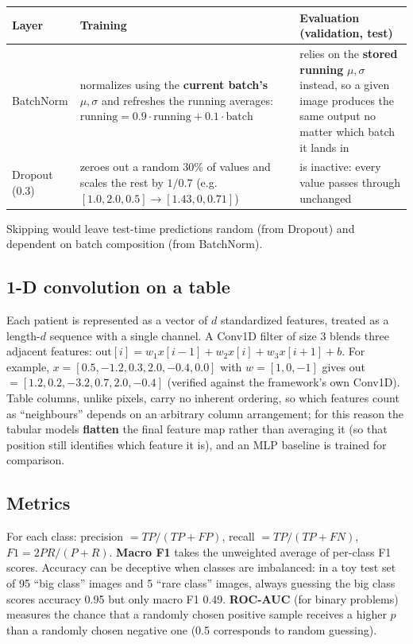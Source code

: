\documentclass[11pt, a4paper]{article}
\newcommand{\code}[1]{\texttt{\detokenize{#1}}}
\begin{document}
\begin{table}[H]
\centering
\small
\begin{tabular}{p{2.6cm}p{5.8cm}p{6.0cm}}
\toprule
Layer & Training & Evaluation (validation, test) \\
\midrule
BatchNorm & normalizes using the \textbf{current batch's} $\mu, \sigma$ and refreshes the running averages:
  $\text{running} = 0.9\cdot\text{running} + 0.1\cdot\text{batch}$
  & relies on the \textbf{stored running} $\mu, \sigma$ instead, so a given image produces the same output no matter
  which batch it lands in \\
Dropout (0.3) & zeroes out a random 30\% of values and scales the rest by $1/0.7$
  (e.g.\ $[1.0, 2.0, 0.5] \to [1.43, 0, 0.71]$) & is inactive: every value passes through unchanged \\
\bottomrule
\end{tabular}
\end{table}
Skipping \code{model.eval()} would leave test-time predictions random (from Dropout) and dependent on batch
composition (from BatchNorm).

\subsection{1-D convolution on a table}
Each patient is represented as a vector of $d$ standardized features, treated as a length-$d$ sequence with a single
channel. A Conv1D filter of size 3 blends three adjacent features: $\text{out}[i] = w_1x[i-1] + w_2x[i] + w_3x[i+1] + b$.
For example, $x = [0.5, -1.2, 0.3, 2.0, -0.4, 0.0]$ with $w = [1, 0, -1]$ gives
out $= [1.2, 0.2, -3.2, 0.7, 2.0, -0.4]$ (verified against the framework's own Conv1D). Table columns, unlike pixels,
carry no inherent ordering, so which features count as ``neighbours'' depends on an arbitrary column arrangement; for
this reason the tabular models \textbf{flatten} the final feature map rather than averaging it (so that position
still identifies which feature it is), and an MLP baseline is trained for comparison.

\subsection{Metrics}
For each class: precision $= TP/(TP+FP)$, recall $= TP/(TP+FN)$, $F1 = 2PR/(P+R)$. \textbf{Macro F1} takes the
unweighted average of per-class F1 scores. Accuracy can be deceptive when classes are imbalanced: in a toy test set of
95 ``big class'' images and 5 ``rare class'' images, always guessing the big class scores accuracy 0.95 but only macro
F1 0.49. \textbf{ROC-AUC} (for binary problems) measures the chance that a randomly chosen positive sample receives a
higher $p$ than a randomly chosen negative one (0.5 corresponds to random guessing).
\end{document}
